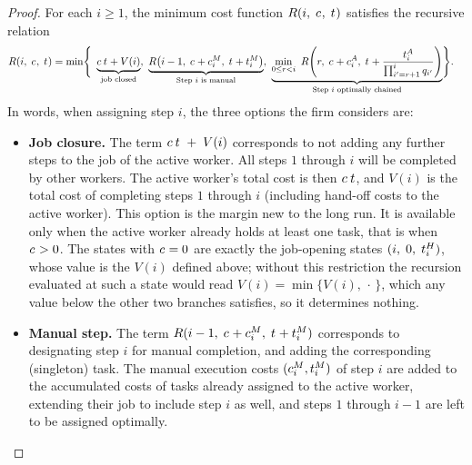 \begin{proof}
For each $i \geq 1$, the minimum cost function $R(i,\; c_{},\; t_{})$ satisfies the recursive relation
\begingroup\smalldisplay
\begin{align*}
R(i,\; \skillcost{},\; \timecost{}) = \min\Biggl\{
& \ \underbrace{\skillcost{}\,\timecost{} + V(i)}_{\text{job closed}}, \ \underbrace{R\bigl(i-1,\; \skillcost{} + \manualSkill{i},\; \timecost{} + \manualTime{i}\bigr)}_{\text{Step $i$ is manual}}, \ \underbrace{\min_{0 \le r < i}\ R\!\left(r,\; \skillcost{} + \AIskill{i},\; \timecost{} + \frac{\AItime{i}}{\prod_{i'=r+1}^{i} q_{i'}}\right)}_{\text{Step $i$ optimally chained}}
\Biggr\}.
\end{align*}
\endgroup
In words, when assigning step $i$, the three options the firm considers are:
\begin{itemize}
    \item \textbf{Job closure.}
    The term $c_{}\,t_{} \; + \; V(i)$ corresponds to not adding any further steps to the job of the active worker.
    All steps $1$ through $i$ will be completed by other workers.
    The active worker's total cost is then $c_{}\,t_{}$, and $V(i)$ is the total cost of completing steps $1$ through $i$ (including hand-off costs to the active worker).
    This option is the margin new to the long run.
    It is available only when the active worker already holds at least one task, that is when $c_{} > 0$.
    The states with $c_{} = 0$ are exactly the job-opening states $(i,\; 0,\; t^{H}_{i})$, whose value is the $V(i)$ defined above; without this restriction the recursion evaluated at such a state would read $V(i) = \min\{V(i),\, \cdot\,\}$, which any value below the other two branches satisfies, so it determines nothing.

    \item \textbf{Manual step.}
    The term $R(i-1,\; c_{} + c^{M}_{i},\; t_{} + t^{M}_{i})$ corresponds to designating step $i$ for manual completion, and adding the corresponding (singleton) task.
    The manual execution costs $(c^{M}_{i}, t^{M}_{i})$ of step $i$ are added to the accumulated costs of tasks already assigned to the active worker, extending their job to include step $i$ as well, and steps $1$ through $i-1$ are left to be assigned optimally.


\end{itemize}
\end{proof}
